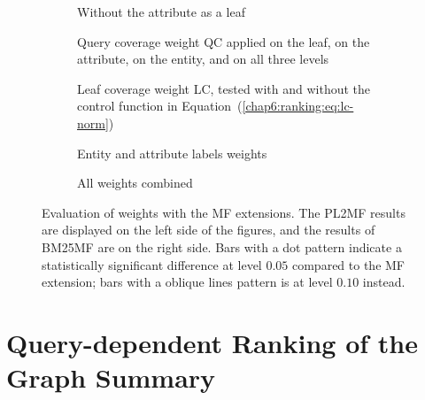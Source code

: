 \begin{figure}
	\centering
	\begin{subfigure}{.483\textwidth}
		\centering
		\resizebox{\textwidth}{!}{
			
		}
		\caption{Without the attribute as a leaf}
		\label{chap6:ranking:fig:mf-att}
	\end{subfigure}
	\quad
	\begin{subfigure}{.483\textwidth}
		\centering
		\resizebox{\textwidth}{!}{
			
		}
		\caption{Query coverage weight QC applied on the leaf, on the attribute, on the entity, and on all three levels}
		\label{chap6:ranking:fig:mf-qc}
	\end{subfigure}
	\qquad
	\begin{subfigure}{.483\textwidth}
		\centering
		\resizebox{\textwidth}{!}{
			
		}
		\caption{Leaf coverage weight LC, tested with and without the control function in Equation~(\ref{chap6:ranking:eq:lc-norm})}
		\label{chap6:ranking:fig:mf-lc}
	\end{subfigure}
	\quad
	\begin{subfigure}{.483\textwidth}
		\centering
		\resizebox{\textwidth}{!}{
			
		}
		\caption{Entity and attribute labels weights}
		\label{chap6:ranking:fig:mf-ael}
	\end{subfigure}
	\qquad
	\begin{subfigure}{.8\textwidth}
		\centering
		\resizebox{\textwidth}{!}{
			
		}
		\caption{All weights combined}
		\label{chap6:ranking:fig:mf-all}
	\end{subfigure}
	\caption[Evaluation of weights with the MF ranking extensions]{Evaluation of weights with the \gls{MF} extensions. The \gls{PL2MF} results are displayed on the left side of the figures, and the results of \gls{BM25MF} are on the right side. Bars with a dot pattern indicate a statistically significant difference at level $0.05$ compared to the \gls{MF} extension; bars with a oblique lines pattern is at level $0.10$ instead.}
	\label{chap6:ranking:fig:mf-weights}
\end{figure}

\section{Query-dependent Ranking of the Graph Summary}
\label{sec:summary-ranking}

